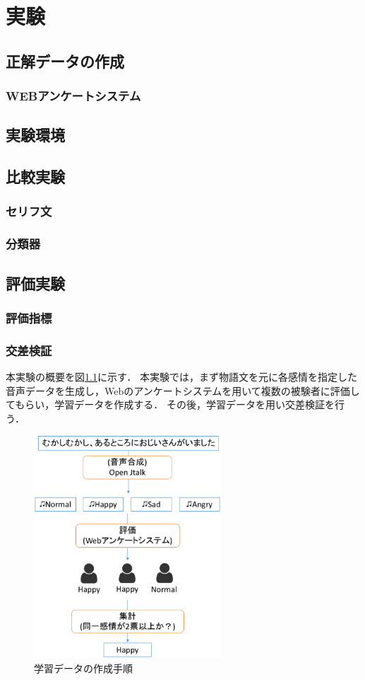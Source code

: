 \chapter{実験}

\section{正解データの作成}
\subsection{WEBアンケートシステム}

\section{実験環境}
\section{比較実験}
\subsection{セリフ文}
\subsection{分類器}
\section{評価実験}
\subsection{評価指標}
\subsection{交差検証}


本実験の概要を図\ref{fig:enquete}に示す．
本実験では，まず物語文を元に各感情を指定した音声データを生成し，Webのアンケートシステムを用いて複数の被験者に評価してもらい，学習データを作成する．
その後，学習データを用い交差検証を行う．

\begin{figure}[ht]
  \begin{center}
    \includegraphics[clip,width=7.0cm]{fig/enquete.eps}
    \caption{学習データの作成手順}
    \label{fig:enquete}
  \end{center}
\end{figure}

